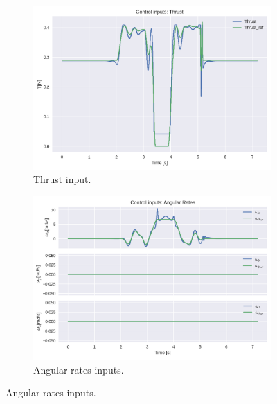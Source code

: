 \documentclass{thesisreport}
\begin{document}
\begin{figure}[H]
\medskip
	\begin{subfigure}{0.48\textwidth}
		\includegraphics[width=\linewidth]{Images/acados_simulations/flip_trajectory/3D_quadrotor/thrustInput.png}
		\caption{Thrust input.} \label{fig:3D_flip_sim_thrust_input}
	\end{subfigure}\hspace*{\fill}
	\begin{subfigure}{0.45\textwidth}
		\includegraphics[width=\linewidth]{Images/acados_simulations/flip_trajectory/3D_quadrotor/angulareRatesInputs.png}
		\caption{Angular rates inputs.} \label{fig:3D_flip_sim_rates_input}
	\end{subfigure}
	

\end{figure}
\end{document}
